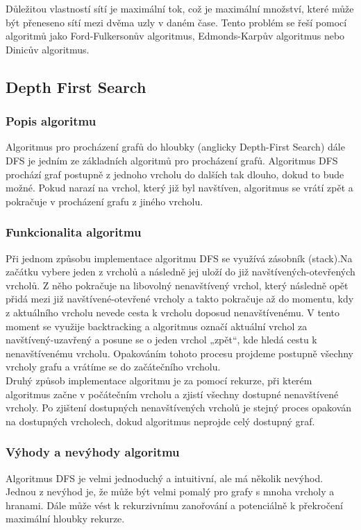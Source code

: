 \documentclass[12pt, titlepage, a4paper]{article}
\begin{document}
Důležitou vlastností sítí je maximální tok, což je maximální množství, které může být přeneseno 
sítí mezi dvěma uzly v daném čase. Tento problém se řeší pomocí algoritmů jako Ford-Fulkersonův 
algoritmus, Edmonds-Karpův algoritmus nebo Dinicův algoritmus.
~\cite{GeeksforGeeks: Algorithms}
\clearpage

\subsection{Depth First Search}
\subsubsection{Popis algoritmu}
Algoritmus pro procházení grafů do hloubky (anglicky Depth-First Search) dále DFS
je jedním ze základních algoritmů pro procházení grafů. Algoritmus DFS prochází 
graf postupně z jednoho vrcholu do dalších tak dlouho, dokud to bude možné. 
Pokud narazí na vrchol, který již byl navštíven, algoritmus se vrátí zpět a pokračuje 
v procházení grafu z jiného vrcholu.
~\cite{GeeksforGeeks: DFS,Khan Academy: DFS}

\subsubsection{Funkcionalita algoritmu}
Při jednom způsobu implementace algoritmu DFS se využívá zásobník (stack).Na začátku vybere jeden z vrcholů a 
následně jej uloží do již navštívených-otevřených vrcholů. Z něho pokračuje na libovolný nenavštívený vrchol, 
který následně opět přidá mezi již navštívené-otevřené vrcholy a takto pokračuje až do momentu, kdy 
z aktuálního vrcholu nevede cesta k vrcholu doposud nenavštívenému. V tento moment se využije 
backtracking a algoritmus označí aktuální vrchol za navštívený-uzavřený a posune se o jeden vrchol 
„zpět“, kde hledá cestu k nenavštívenému vrcholu. Opakováním tohoto procesu projdeme postupně 
všechny vrcholy grafu a vrátíme se do začátečního vrcholu.
\\

Druhý způsob implementace algoritmu je za pomocí rekurze, při kterém algoritmus začne v 
počátečním vrcholu a zjistí všechny dostupné nenavštívené vrcholy. Po zjištení dostupných 
nenavštívených vrcholů je stejný proces opakován na dostupných vrcholech, dokud algoritmus 
neprojde celý dostupný graf.
~\cite{GeeksforGeeks: DFS,Khan Academy: DFS}

\subsubsection{Výhody a nevýhody algoritmu}
Algoritmus DFS je velmi jednoduchý a intuitivní, ale má několik nevýhod. Jednou z 
nevýhod je, že může být velmi pomalý pro grafy s mnoha vrcholy a hranami. Dále může 
vést k rekurzivnímu zanořování a potenciálně k překročení maximální hloubky rekurze.
\end{document}
